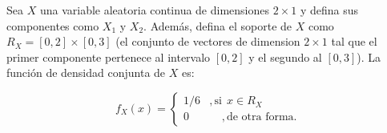 \documentclass[11pt]{exam}
\begin{document}
\begin{questions}

\question[10] Sea $X$ una variable aleatoria continua de dimensiones $2 \times 1$ y defina sus componentes como $X_1$ y $X_2$. Adem\'as, defina el soporte de $X$ como $R_X=[0,2]\times[0,3]$ (el conjunto de vectores de dimension $2\times 1$ tal que el primer componente pertenece al intervalo $[0,2]$ y el segundo al $[0,3]$). La funci\'on de densidad conjunta de $X$ es:

\begin{equation}
f_X(x)=\left\{\begin{matrix}
1/6 &, \text{si}~~x \in R_X \\ 
0 & ~~~~~,\text{de otra forma}. 
\end{matrix}\right.
\end{equation}


\newpage

\end{questions}
\end{document}
